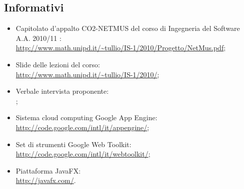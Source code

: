\subsection{Informativi}
\begin{itemize}
  \item Capitolato d'appalto CO2-NETMUS del corso di Ingegneria del Software
  A.A. 2010/11 :\\
  \url{http://www.math.unipd.it/~tullio/IS-1/2010/Progetto/NetMus.pdf};
  \item Slide delle lezioni del corso:\\
  \url{http://www.math.unipd.it/~tullio/IS-1/2010/};
  \item Verbale intervista proponente:\\
  ;
  \item Sistema cloud computing Google App Engine:\\
  \url{http://code.google.com/intl/it/appengine/};
  \item Set di strumenti Google Web Toolkit:\\
  \url{http://code.google.com/intl/it/webtoolkit/};
  \item Piattaforma JavaFX:\\
  \url{http://javafx.com/}.
\end{itemize}
